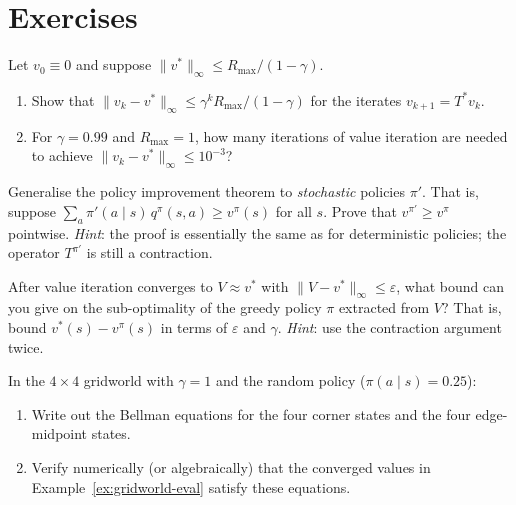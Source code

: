 \section*{Exercises}

\begin{exercise}
\label{ex:dp-contraction-rate}
Let $v_0 \equiv 0$ and suppose $\|v^*\|_\infty \le R_{\max}/(1-\gamma)$.
\begin{enumerate}[label=(\alph*)]
  \item Show that $\|v_k - v^*\|_\infty \le \gamma^k R_{\max}/(1-\gamma)$ for the iterates $v_{k+1} = T^* v_k$.
  \item For $\gamma = 0.99$ and $R_{\max} = 1$, how many iterations of value iteration are needed to achieve $\|v_k - v^*\|_\infty \le 10^{-3}$?
\end{enumerate}
\end{exercise}

\begin{exercise}
\label{ex:dp-policy-improvement-stochastic}
Generalise the policy improvement theorem to \emph{stochastic} policies $\pi'$.  That is, suppose $\sum_a \pi'(a \mid s)\,q^\pi(s,a) \ge v^\pi(s)$ for all $s$.  Prove that $v^{\pi'} \ge v^\pi$ pointwise.  \emph{Hint}: the proof is essentially the same as for deterministic policies; the operator $T^{\pi'}$ is still a contraction.
\end{exercise}

\begin{exercise}
\label{ex:dp-value-iter-policy}
After value iteration converges to $V \approx v^*$ with $\|V - v^*\|_\infty \le \varepsilon$, what bound can you give on the sub-optimality of the greedy policy $\pi$ extracted from $V$?  That is, bound $v^*(s) - v^\pi(s)$ in terms of $\varepsilon$ and $\gamma$.  \emph{Hint}: use the contraction argument twice.
\end{exercise}

\begin{exercise}
\label{ex:dp-gridworld-compute}
In the $4\times4$ gridworld with $\gamma=1$ and the random policy ($\pi(a \mid s) = 0.25$):
\begin{enumerate}[label=(\alph*)]
  \item Write out the Bellman equations for the four corner states and the four edge-midpoint states.
  \item Verify numerically (or algebraically) that the converged values in Example~\ref{ex:gridworld-eval} satisfy these equations.
\end{enumerate}
\end{exercise}

